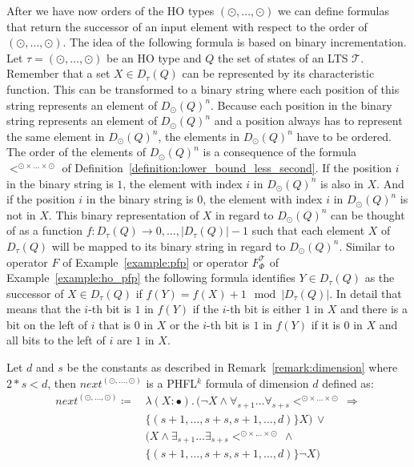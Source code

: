 After we have now orders of the HO types $(\odot, \dots, \odot)$ we can define formulas that return the successor of
an input element with respect to the order of $(\odot, \dots, \odot)$. The idea of the following formula is based on
binary incrementation. Let $\tau = (\odot, \dots, \odot)$ be an HO type and $Q$ the set of states of an LTS
$\mathcal{T}$. Remember that a set $X \in D_\tau(Q)$ can be represented by its characteristic
function. This can be transformed to a binary string where each position of this string represents an element of
$D_{\odot}(Q)^n$. Because each position in the binary string represents an element of $D_{\odot}
(Q)^n$ and a position always has to represent the same element in $D_{\odot}(Q)^n$, the elements
in $D_{\odot}(Q)^n$ have to be ordered. The order of the elements of $D_{\odot}(Q)^n$ is a consequence of
the formula $<^{\odot \times \dots \times \odot}$ of Definition~\ref{definition:lower_bound_less_second}. If the position
$i$ in the binary string is $1$, the element with index $i$ in $D_{\odot}(Q)^n$ is
also in $X$. And if the position $i$ in the binary string is $0$, the element with index $i$ in $D_{\odot}
(Q)^n$ is not in $X$. This binary representation of $X$ in regard to $D_{\odot}
(Q)^n$ can be thought of as a function $f \colon D_\tau(Q) \rightarrow 
{0, \dots, |D_\tau(Q)| - 1}$ such that
each element $X$ of $D_\tau(Q)$ will be mapped to its binary string in regard to 
$D_{\odot}(Q)^n$. Similar to operator $F$ of Example~\ref{example:pfp} or operator 
$F_\Phi^\mathcal{T}$ of Example~\ref{example:ho_pfp} the following formula identifies $Y \in 
D_\tau(Q)$ as the successor of $X \in D_\tau(Q)$ if $f(Y) = f(X) + 1 
\mod |D_\tau(Q)|$. In detail that means that the $i$-th bit is $1$ in $f(Y)$ if 
the $i$-th bit is either $1$ in $X$ and there is a bit on the left of $i$ that is $0$ in 
$X$ or the $i$-th bit is $1$ in $f(Y)$ if it is $0$ in $X$ and all bits to the left of $i$ are $1$ in $X
$. 

\begin{definition}
    \label{definition:lower_bounds_next_second}
    Let $d$ and $s$ be the constants as described in Remark~\ref{remark:dimension} where $2*s < d$, then $next^{(\odot, \dots, \odot)}$
    is a PHFL$^k$ formula of dimension $d$ defined as:
    \begin{align*}
        next^{(\odot, \dots, \odot)} \coloneqq &\,\lambda (X \colon \bullet).\, (\neg X \wedge \forall_{s +
        1}\dots\forall_{s + s}<^{\odot \times \dots \times \odot}\, \Rightarrow \\&\,\{(s +
        1, \dots, s + s, s + 1, \dots, d)\} X) \,\vee \\&\,(X \wedge \exists_{s + 1}\dots\exists_{s + s} <^{\odot
        \times \dots \times \odot} \,\wedge \\&\,\{(s + 1, \dots, s + s, s + 1, \dots, d)\}
        \neg X)
    \end{align*}
\end{definition}

